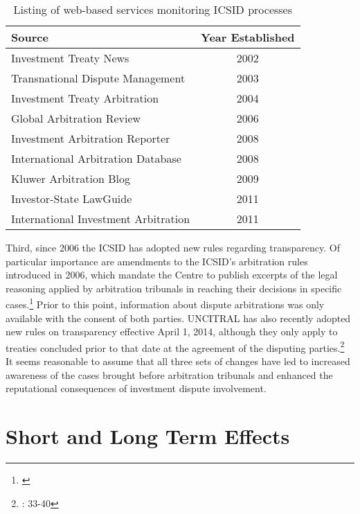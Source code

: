 \documentclass[12pt,onesided]{amsart}
\begin{document}
\begin{table}[ht]
\centering
\caption{Listing of web-based services monitoring ICSID processes}
\label{tab:disputeSites}
\begin{tabular}{lc}
	\hline\hline
	Source & Year Established \\
	\hline
	Investment Treaty News & 2002 \\
	Transnational Dispute Management & 2003 \\
	Investment Treaty Arbitration & 2004 \\
	Global Arbitration Review & 2006 \\
	Investment Arbitration Reporter & 2008 \\
	International Arbitration Database & 2008 \\
	Kluwer Arbitration Blog & 2009 \\
	Investor-State LawGuide & 2011 \\
	International Investment Arbitration & 2011 \\
	\hline\hline
\end{tabular}
\end{table}
\FloatBarrier

Third, since 2006 the ICSID has adopted new rules regarding transparency. Of particular importance are amendments to the ICSID's arbitration rules introduced in 2006, which mandate the Centre to publish excerpts of the legal reasoning applied by arbitration tribunals in reaching their decisions in specific cases.\footnote{\citet{yackee20112006,antonietti:2006}} Prior to this point, information about dispute arbitrations was only available with the consent of both parties. UNCITRAL has also recently adopted new rules on transparency effective April 1, 2014, although they only apply to treaties concluded prior to that date at the agreement of the disputing parties.\footnote{\citet{uncitral:2013}: 33-40 } It seems reasonable to assume that all three sets of changes have led to increased awareness of the cases brought before arbitration tribunals and enhanced the reputational consequences of investment dispute involvement.

\section*{Short and Long Term Effects}
\end{document}
